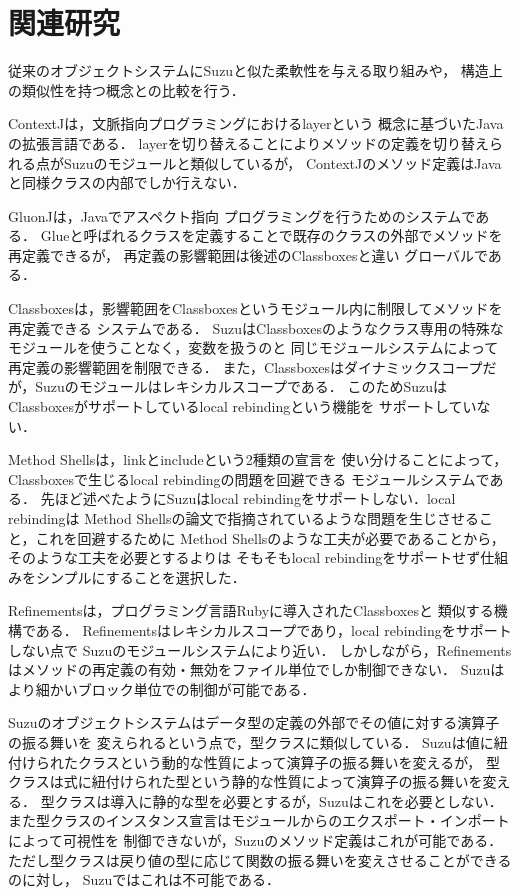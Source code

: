 \documentclass{ipsjprosym}
\begin{document}
\section{関連研究}

従来のオブジェクトシステムにSuzuと似た柔軟性を与える取り組みや，
構造上の類似性を持つ概念との比較を行う．

ContextJ\cite{AppeltauerMalte:2011}は，文脈指向プログラミングにおけるlayerという
概念に基づいたJavaの拡張言語である．
layerを切り替えることによりメソッドの定義を切り替えられる点がSuzuのモジュールと類似しているが，
ContextJのメソッド定義はJavaと同様クラスの内部でしか行えない．

GluonJ\cite{Chiba:2010:MMC:1869459.1869503}は，Javaでアスペクト指向
プログラミングを行うためのシステムである．
Glueと呼ばれるクラスを定義することで既存のクラスの外部でメソッドを再定義できるが，
再定義の影響範囲は後述のClassboxes\cite{Bergel:2005:CCV:1646591.1646599}と違い
グローバルである．

Classboxesは，影響範囲をClassboxesというモジュール内に制限してメソッドを再定義できる
システムである．
SuzuはClassboxesのようなクラス専用の特殊なモジュールを使うことなく，変数を扱うのと
同じモジュールシステムによって再定義の影響範囲を制限できる．
また，Classboxesはダイナミックスコープだが，Suzuのモジュールはレキシカルスコープである．
このためSuzuはClassboxesがサポートしているlocal rebindingという機能を
サポートしていない．

Method Shells\cite{Takeshita:2014-07-14}は，linkとincludeという2種類の宣言を
使い分けることによって，Classboxesで生じるlocal rebindingの問題を回避できる
モジュールシステムである．
先ほど述べたようにSuzuはlocal rebindingをサポートしない．local rebindingは
Method Shellsの論文で指摘されているような問題を生じさせること，これを回避するために
Method Shellsのような工夫が必要であることから，そのような工夫を必要とするよりは
そもそもlocal rebindingをサポートせず仕組みをシンプルにすることを選択した．

Refinements\cite{Maeda:2013}は，プログラミング言語Rubyに導入されたClassboxesと
類似する機構である．
Refinementsはレキシカルスコープであり，local rebindingをサポートしない点で
Suzuのモジュールシステムにより近い．
しかしながら，Refinementsはメソッドの再定義の有効・無効をファイル単位でしか制御できない．
Suzuはより細かいブロック単位での制御が可能である．

Suzuのオブジェクトシステムはデータ型の定義の外部でその値に対する演算子の振る舞いを
変えられるという点で，型クラス\cite{Wadler:1989:MAP:75277.75283}に類似している．
Suzuは値に紐付けられたクラスという動的な性質によって演算子の振る舞いを変えるが，
型クラスは式に紐付けられた型という静的な性質によって演算子の振る舞いを変える．
型クラスは導入に静的な型を必要とするが，Suzuはこれを必要としない．
また型クラスのインスタンス宣言はモジュールからのエクスポート・インポートによって可視性を
制御できないが，Suzuのメソッド定義はこれが可能である．
ただし型クラスは戻り値の型に応じて関数の振る舞いを変えさせることができるのに対し，
Suzuではこれは不可能である．
\end{document}
